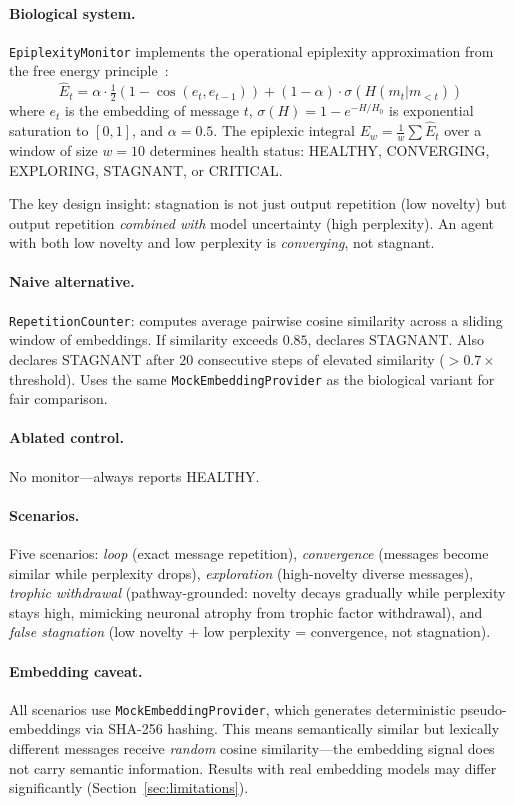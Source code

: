 \paragraph{Biological system.}
\texttt{EpiplexityMonitor} implements the operational epiplexity
approximation from the free energy principle~\cite{friston2010}:
\[
  \hat{E}_t = \alpha \cdot \tfrac{1}{2}(1 - \cos(e_t, e_{t-1}))
            + (1 - \alpha) \cdot \sigma(H(m_t | m_{<t}))
\]
where $e_t$ is the embedding of message $t$, $\sigma(H) = 1 - e^{-H/H_0}$
is exponential saturation to $[0, 1]$, and $\alpha = 0.5$.  The
epiplexic integral $E_w = \frac{1}{w} \sum \hat{E}_t$ over a window of
size $w = 10$ determines health status: HEALTHY, CONVERGING, EXPLORING,
STAGNANT, or CRITICAL.

The key design insight: stagnation is not just output repetition (low
novelty) but output repetition \emph{combined with} model uncertainty
(high perplexity).  An agent with both low novelty and low perplexity
is \emph{converging}, not stagnant.

\paragraph{Naive alternative.}
\texttt{RepetitionCounter}: computes average pairwise cosine similarity
across a sliding window of embeddings.  If similarity exceeds $0.85$,
declares STAGNANT.  Also declares STAGNANT after $20$ consecutive steps
of elevated similarity ($> 0.7 \times$ threshold).  Uses the same
\texttt{MockEmbeddingProvider} as the biological variant for fair
comparison.

\paragraph{Ablated control.}
No monitor---always reports HEALTHY.

\paragraph{Scenarios.}
Five scenarios: \emph{loop} (exact message repetition), \emph{convergence}
(messages become similar while perplexity drops), \emph{exploration}
(high-novelty diverse messages), \emph{trophic withdrawal}
(pathway-grounded: novelty decays gradually while perplexity stays
high, mimicking neuronal atrophy from trophic factor withdrawal), and
\emph{false stagnation} (low novelty + low perplexity = convergence,
not stagnation).

\paragraph{Embedding caveat.}
All scenarios use \texttt{MockEmbeddingProvider}, which generates
deterministic pseudo-embeddings via SHA-256 hashing.  This means
semantically similar but lexically different messages receive
\emph{random} cosine similarity---the embedding signal does not
carry semantic information.  Results with real embedding models may
differ significantly (Section~\ref{sec:limitations}).

